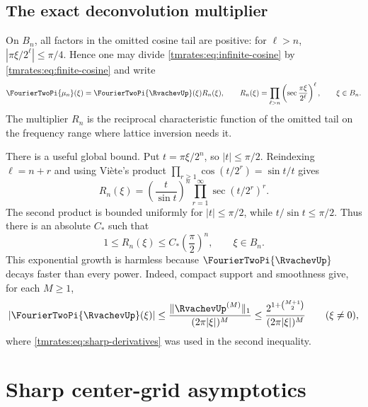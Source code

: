 \documentclass[11pt,oneside]{article}
\theoremstyle{definition}
\theoremstyle{remark}
\begin{document}
\subsection{The exact deconvolution multiplier}

On $B_n$, all factors in the omitted cosine tail are positive: for $\ell>n$,
$|\pi\xi/2^\ell|\le\pi/4$.  Hence one may divide \eqref{tmrates:eq:infinite-cosine} by
\eqref{tmrates:eq:finite-cosine} and write
\begin{equation}
 \FourierTwoPi{\mu_n}(\xi)=\FourierTwoPi{\RvachevUp}(\xi)R_n(\xi),
 \qquad
 R_n(\xi)=\prod_{\ell>n}
  \left(\sec\frac{\pi\xi}{2^\ell}\right)^\ell,
 \qquad \xi\in B_n.                                      \label{tmrates:eq:Rn}
\end{equation}
The multiplier $R_n$ is the reciprocal characteristic function of the omitted tail on the
frequency range where lattice inversion needs it.

There is a useful global bound.  Put $t=\pi\xi/2^n$, so $|t|\le\pi/2$.  Reindexing
$\ell=n+r$ and using Vi\`ete's product
$\prod_{r\ge1}\cos(t/2^r)=\sin t/t$ gives
\begin{equation}
 R_n(\xi)
 =\left(\frac{t}{\sin t}\right)^n
   \prod_{r=1}^{\infty}\sec(t/2^r)^r.                     \label{tmrates:eq:Rn-viete}
\end{equation}
The second product is bounded uniformly for $|t|\le\pi/2$, while
$t/\sin t\le\pi/2$.  Thus there is an absolute $C_*$ such that
\begin{equation}
 1\le R_n(\xi)\le C_*\left(\frac\pi2\right)^n,
 \qquad \xi\in B_n.                                      \label{tmrates:eq:Rn-global-bound}
\end{equation}
This exponential growth is harmless because $\FourierTwoPi{\RvachevUp}$ decays faster
than every power.
Indeed, compact support and smoothness give, for each $M\ge1$,
\begin{equation}
 |\FourierTwoPi{\RvachevUp}(\xi)|
 \le\frac{\|\RvachevUp^{(M)}\|_1}{(2\pi|\xi|)^M}
 \le\frac{2^{1+\binom{M+1}{2}}}{(2\pi|\xi|)^M}
 \qquad(\xi\ne0),                                        \label{tmrates:eq:fourier-rapid}
\end{equation}
where \eqref{tmrates:eq:sharp-derivatives} was used in the second inequality.

\section{Sharp center-grid asymptotics}
\label{tmrates:sec:center-rate}
\end{document}
